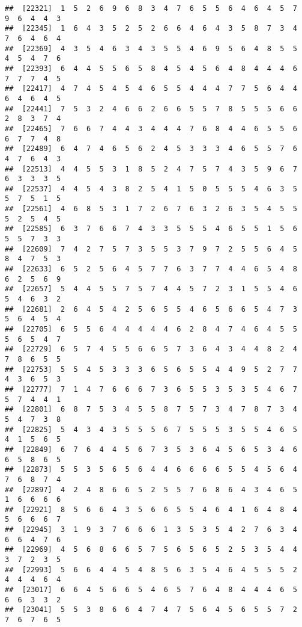 \documentclass[
]{book}
\begin{document}
\begin{verbatim}
##  [22321]  1  5  2  6  9  6  8  3  4  7  6  5  5  6  4  6  4  5  7  9  6  4  4  3
##  [22345]  1  6  4  3  5  2  5  2  6  6  4  6  4  3  5  8  7  3  4  7  6  4  6  4
##  [22369]  4  3  5  4  6  3  4  3  5  5  4  6  9  5  6  4  8  5  5  4  5  4  7  6
##  [22393]  6  4  4  5  5  6  5  8  4  5  4  5  6  4  8  4  4  4  6  7  7  7  4  5
##  [22417]  4  7  4  5  4  5  4  6  5  5  4  4  4  7  7  5  6  4  4  6  4  6  4  5
##  [22441]  7  5  3  2  4  6  6  2  6  6  5  5  7  8  5  5  5  6  6  2  8  3  7  4
##  [22465]  7  6  6  7  4  4  3  4  4  4  7  6  8  4  4  6  5  5  6  6  7  7  4  8
##  [22489]  6  4  7  4  6  5  6  2  4  5  3  3  3  4  6  5  5  7  6  4  7  6  4  3
##  [22513]  4  4  5  5  3  1  8  5  2  4  7  5  7  4  3  5  9  6  7  6  3  3  3  5
##  [22537]  4  4  5  4  3  8  2  5  4  1  5  0  5  5  5  4  6  3  5  5  7  5  1  5
##  [22561]  4  6  8  5  3  1  7  2  6  7  6  3  2  6  3  5  4  5  5  5  2  5  4  5
##  [22585]  6  3  7  6  6  7  4  3  3  5  5  5  4  6  5  5  1  5  6  5  5  7  3  3
##  [22609]  7  4  2  7  5  7  3  5  5  3  7  9  7  2  5  5  6  4  5  8  4  7  5  3
##  [22633]  6  5  2  5  6  4  5  7  7  6  3  7  7  4  4  6  5  4  8  6  2  5  6  9
##  [22657]  5  4  4  5  5  7  5  7  4  4  5  7  2  3  1  5  5  4  6  5  4  6  3  2
##  [22681]  2  6  4  5  4  2  5  6  5  5  4  6  5  6  6  5  4  7  3  5  6  4  5  4
##  [22705]  6  5  5  6  4  4  4  4  4  6  2  8  4  7  4  6  4  5  5  5  6  5  4  7
##  [22729]  6  5  7  4  5  5  6  6  5  7  3  6  4  3  4  4  8  2  4  7  8  6  5  5
##  [22753]  5  5  4  5  3  3  3  6  5  6  5  5  4  4  9  5  2  7  7  4  3  6  5  3
##  [22777]  7  1  4  7  6  6  6  7  3  6  5  5  3  5  3  5  4  6  7  5  7  4  4  1
##  [22801]  6  8  7  5  3  4  5  5  8  7  5  7  3  4  7  8  7  3  4  5  4  7  3  8
##  [22825]  5  4  3  4  3  5  5  5  6  7  5  5  5  3  5  5  4  6  5  4  1  5  6  5
##  [22849]  6  7  6  4  4  5  6  7  3  5  3  6  4  5  6  5  3  4  6  6  5  8  6  5
##  [22873]  5  5  3  5  6  5  6  4  4  6  6  6  6  5  5  4  5  6  4  7  6  8  7  4
##  [22897]  4  2  4  8  6  6  5  2  5  5  7  6  8  6  4  3  4  6  5  1  6  6  6  6
##  [22921]  8  5  6  6  4  3  5  6  6  5  5  4  6  4  1  6  4  8  4  5  6  6  6  7
##  [22945]  3  1  9  3  7  6  6  6  1  3  5  3  5  4  2  7  6  3  4  6  6  4  7  6
##  [22969]  4  5  6  8  6  6  5  7  5  6  5  6  5  2  5  3  5  4  4  3  7  2  3  5
##  [22993]  5  6  6  4  4  5  4  8  5  6  3  5  4  6  4  5  5  5  2  4  4  4  6  4
##  [23017]  6  6  4  5  6  6  5  4  6  5  7  6  4  8  4  4  4  6  5  6  6  3  3  2
##  [23041]  5  5  3  8  6  6  4  7  4  7  5  6  4  5  6  5  5  7  2  7  6  7  6  5

\end{verbatim}
\end{document}
